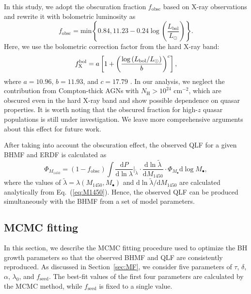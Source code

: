 \documentclass[twocolumn, twocolappendix]{aastex63}
\newcommand{\Mbh}{M_\bullet}
\newcommand{\tlife}{\tau}
\newcommand{\fseed}{f_\mathrm{seed}}
\newcommand{\fobsc}{f_\mathrm{obsc}}
\newcommand{\Muv}{M_{1450}}
\newcommand{\Lbol}{L_\mathrm{bol}}
\newcommand{\D}{\mathrm{d}}
\begin{document}
\begin{CJK*}{UTF8}{gbsn}
In this study, we adopt the obscuration fraction $\fobsc$ based on X-ray observations \citep{2014ApJ...786..104U}
and rewrite it with bolometric luminosity as
%
\begin{equation}
\fobsc = \text{min}\left\{0.84 , 11.23-0.24 \log \left(\frac{\Lbol}{L_\odot}\right) \right \}.
\end{equation}
%
Here, we use the bolometric correction factor from the hard X-ray band:
%
\begin{equation}
  f^{\rm bol}_{\rm X} =
  a\left[1+\left(\frac{\log \left(\Lbol / L_\odot\right)}{b}\right)^{c}\right],
\end{equation}
%
where $a=10.96$, $b = 11.93$, and $c = 17.79$ \citep[see Eq.~(2) in][]{2020A&A...636A..73D}. 
In our analysis, we neglect the contribution from Compton-thick AGNs with $N_\mathrm{H}>10^{24}$ cm$^{-2}$, 
which are obscured even in the hard X-ray band and show possible dependence on quasar properties.
It is worth noting that the obscured fraction for high-$z$ quasar populations is still under investigation.
We leave more comprehensive arguments about this effect for future work.


After taking into account the obscuration effect, 
the observed QLF for a given BHMF and ERDF is calculated as
%
\begin{equation}
\label{eq:dn_dM1450}
\Phi_{\Muv} 
 = (1 -\fobsc)  %
\int \frac{\D P}{\D \ln \lambda}\Big|_{\tilde{\lambda}}  \cdot
\frac{\D \ln \tilde{\lambda}}{\D \Muv} \cdot
 \Phi_{\Mbh} \D \log \Mbh,
\end{equation}
%
where the values of $\tilde{\lambda}=\lambda(\Muv, \Mbh)$ and $\D \ln \tilde{\lambda}/\D \Muv$ are calculated analytically from Eq.~(\ref{eq:M1450}).
%
Hence, the observed QLF can be produced simultaneously with the BHMF from a set of model parameters.




\vspace{2mm}
\subsection{MCMC fitting}\label{sec:fitting}



In this section, we describe the MCMC fitting procedure used to optimize 
the BH growth parameters so that the observed BHMF and QLF are consistently reproduced. 
As discussed in Section~\ref{sec:MF}, we consider five parameters of $\tlife$, $\delta$, $\alpha$, $\lambda_0$, and $\fseed$.
The best-fit values of the first four parameters are calculated by the MCMC method, while $\fseed$ is fixed to a single value.


\end{CJK*}
\end{document}
